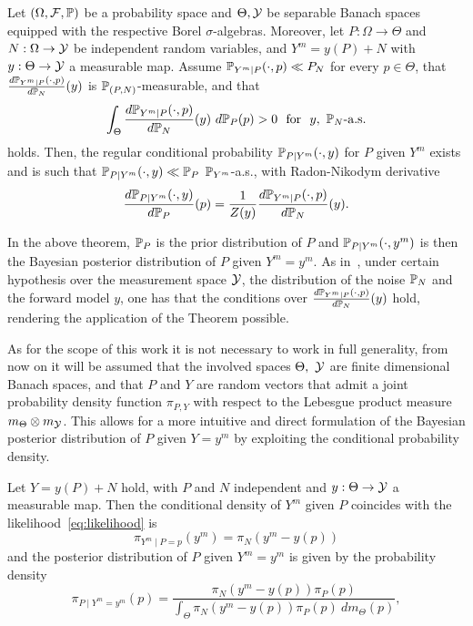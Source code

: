 \begin{thm}
    Let $ (\Omega, \mathcal F , \mathbb P) $ be a probability space and $\Theta, \mathcal Y$ be separable Banach spaces equipped with the respective Borel $\sigma$-algebras. 
    Moreover, let $P : \Omega \rightarrow \Theta$ and $N:\Omega \rightarrow \mathcal Y$ be independent random variables, and $ Y^m = y(P) + N$ with $y: \Theta \rightarrow \mathcal Y$ a measurable map. \newline
    Assume $\mathbb P_{Y^m\mid P}(\cdot, p) \ll P_N$ for every $p \in \Theta$, that $\frac{d \mathbb P_{Y^m\mid P}(\cdot, p)}{d\mathbb P_N}(y) $ is $\mathbb P_{(P,N)}$-measurable, and that 
    \[
        \int_\Theta \frac{d \mathbb P_{Y^m\mid P}(\cdot, p)}{d\mathbb P_N}(y) \ d\mathbb P_P(p) > 0 \ \text{ for }  \ y, \ \mathbb P_N \text{-a.s.}
    \]
    holds.
    Then, the regular conditional probability $\mathbb P_{P\mid Y^m}(\cdot,y)$ for $P$ given $Y^m$ exists and is such that $\mathbb P_{P\mid Y^m}(\cdot, y) \ll \mathbb P _P$ $\mathbb P_{Y^m}$-a.s., with Radon-Nikodym derivative
    \begin{equation}\label{eq:infdimBayes}
        \frac{d\mathbb P_{P\mid Y^m}(\cdot, y)}{d\mathbb P_P}(p) = \frac{1}{Z(y)}\frac{d\mathbb P_{Y^m\mid P}(\cdot, p)}{d\mathbb P_{N}}(y).
    \end{equation}
\end{thm}

In the above theorem, $\mathbb P_P$ is the prior distribution of $P$ and $\mathbb P_{P \mid Y^m}(\cdot, y^m)$ is then the Bayesian posterior distribution of $P$ given $Y^m=y^m$.
As in~\cite[Theorem 6.31]{Stuart2010}, under certain hypothesis over the measurement space $\mathcal Y$, the distribution of the noise $\mathbb P_N$ and the forward model $y$, one has that the conditions over $\frac{d \mathbb P_{Y^m\mid P}(\cdot, p)}{d\mathbb P_N}(y)$ hold, rendering the application of the Theorem possible. \medskip

As for the scope of this work it is not necessary to work in full generality, from now on it will be assumed that the involved spaces $\Theta, \  \mathcal Y$ are finite dimensional Banach spaces, and that $P$ and $Y$ are random vectors that admit a joint probability density function $\pi_{P,Y}$ with respect to the Lebesgue product measure $m_\Theta \otimes m_\mathcal Y$. 
This allows for a more intuitive and direct formulation of the Bayesian posterior distribution of $P$ given $Y=y^m$ by exploiting the conditional probability density.

\begin{thm}
    Let $Y = y(P) + N$ hold, with $P$ and $N$ independent and $y: \Theta \rightarrow \mathcal Y$ a measurable map.
    Then the conditional density of $Y^m$ given $P$ coincides with the likelihood~\eqref{eq:likelihood} is \[
        \pi_{Y^m\mid P = p}(y^m) = \pi_{N}(y^m - y( p) )
    \] and the posterior distribution of $P$ given $Y^m=y^m$ is given by the probability density \begin{equation}\label{eq:Bayes}
        \pi_{P\mid Y^m = y^m}(p) = \frac{\pi_{N}(y^m - y( p) ) \pi_P(p)}{\int_\Theta  \pi_{N}(y^m - y( p) ) \pi_P(p) \ dm_\Theta(p)},
    \end{equation}
\end{thm}

